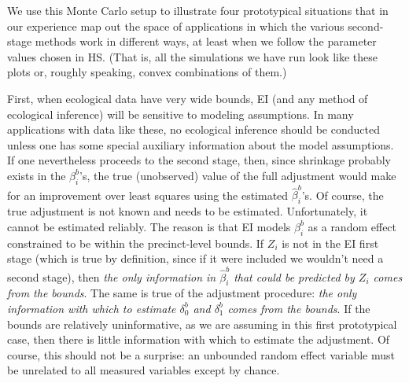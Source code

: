 \documentclass[11pt,titlepage]{article}
\begin{document}
We use this Monte Carlo setup to illustrate four prototypical
situations that in our experience map out the space of applications in
which the various second-stage methods work in different ways, at
least when we follow the parameter values chosen in HS.  (That is, all
the simulations we have run look like these plots or, roughly
speaking, convex combinations of them.)

First, when ecological data have very wide bounds, EI (and any method
of ecological inference) will be sensitive to modeling assumptions.
In many applications with data like these, no ecological inference
should be conducted unless one has some special auxiliary information
about the model assumptions.  If one nevertheless proceeds to the
second stage, then, since shrinkage probably exists in the
$\beta_i^b$'s, the true (unobserved) value of the full adjustment
would make for an improvement over least squares using the estimated
$\hat\beta_i^b$'s.  Of course, the true adjustment is not known and
needs to be estimated.  Unfortunately, it cannot be estimated
reliably.  The reason is that EI models $\beta_i^b$ as a random effect
constrained to be within the precinct-level bounds. If $Z_i$ is not in
the EI first stage (which is true by definition, since if it were
included we wouldn't need a second stage), then \emph{the only
  information in $\hat\beta_i^b$ that could be predicted by $Z_i$
  comes from the bounds}.  The same is true of the adjustment
procedure: \emph{the only information with which to estimate
  $\delta_0^b$ and $\delta_1^b$ comes from the bounds}.  If the bounds
are relatively uninformative, as we are assuming in this first
prototypical case, then there is little information with which to
estimate the adjustment.  Of course, this should not be a surprise: an
unbounded random effect variable must be unrelated to all measured
variables except by chance.
\end{document}
